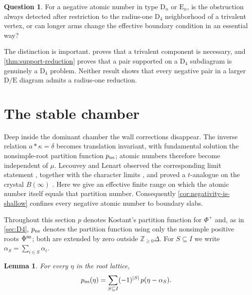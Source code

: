 \documentclass[11pt]{article}
\newtheorem{lemma}[lemma]{Lemma}
\theoremstyle{definition}
\newtheorem{question}[question]{Question}
\theoremstyle{remark}
\newcommand{\Raiz}{\Phi}
\newcommand{\RaizSimp}{\Delta}
\newcommand{\typeD}{\ensuremath{\mathrm{D}}}
\newcommand{\typeE}{\ensuremath{\mathrm{E}}}
\newcommand{\Z}{\mathbb Z}
\begin{document}
\begin{question}\label{q:local-criterion}
For a negative atomic number in type $\typeD_n$ or $\typeE_n$, is the
obstruction always detected after restriction to the radius-one $\typeD_4$
neighborhood of a trivalent vertex, or can longer arms change the effective
boundary condition in an essential way?
\end{question}

The distinction is important.   proves that a
trivalent component is necessary, and \cref{thm:support-reduction} proves that
a pair
supported on a $\typeD_4$ subdiagram is genuinely a $\typeD_4$ problem.  Neither result
shows that every negative pair in a larger $\typeD/\typeE$ diagram admits a
radius-one reduction.


\section{The stable chamber}\label{sec:stabilization}

Deep inside the dominant chamber the wall corrections disappear.  The inverse
relation $a*\kappa=\delta$ becomes translation invariant, with fundamental
solution the nonsimple-root partition function $p_{\rm ns}$; atomic numbers
therefore become independent of $\mu$.  Lecouvey and Lenart observed the
corresponding limit statement \cite[(17)]{MR4178925}, together with the
character limits \cite[Proposition~2.7]{MR4178925}, and proved a $t$-analogue
on the crystal $B(\infty)$ \cite[Corollary~3.4]{MR4178925}.  Here we give an
effective finite range on which the atomic number itself equals that partition
number.  Consequently \cref{cor:negativity-is-shallow} confines every negative
atomic number to boundary slabs.

Throughout this section $p$ denotes Kostant's partition function for
$\Raiz^+$ and, as in \cref{sec:D4}, $p_{\rm ns}$ denotes the partition
function using only the nonsimple positive roots $\Raiz^{\rm ns}$; both are
extended by zero outside $\Z_{\ge0}\RaizSimp$.  For $S\subseteq I$ we write
$\alpha_S=\sum_{i\in S}\alpha_i$.

\begin{lemma}\label{lem:pns-general}
For every $\eta$ in the root lattice,
\begin{equation}\label{eq:pns-general}
   p_{\rm ns}(\eta)=\sum_{S\subseteq I}(-1)^{|S|}\,p(\eta-\alpha_S).
\end{equation}
\end{lemma}
\end{document}
